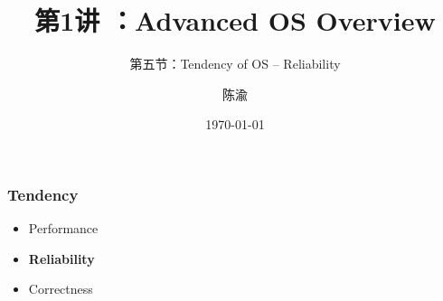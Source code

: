 


\title[第1讲]{第1讲 ：Advanced OS Overview} %
\subtitle{第五节：Tendency of OS -- Reliability}
\author{陈渝} %
\date{\today} %




\begin{frame}
\titlepage %
\end{frame}

%
%
\begin{frame}[plain]
	\frametitle{Tendency}

	\begin{itemize}\huge
	\item Performance
	\item \textbf{Reliability}
	\item Correctness
	
\end{itemize}
\end{frame}


